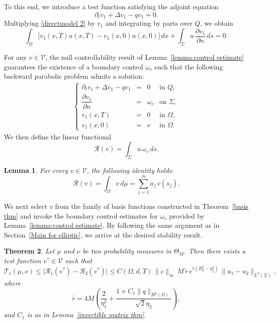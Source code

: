 \documentclass[12pt]{amsart}
\newtheorem{thm}{Theorem}
\newtheorem{lem}[thm]{Lemma}
\begin{document}
To this end, we introduce a test function satisfying the adjoint equation
\[
    \partial_t v_1+\Delta v_1 - q v_1=0.
\]
Multiplying \eqref{directmodel 2} by \(v_1\) and integrating by parts over \(Q\), we obtain
\begin{equation}
    \int_{\Omega} \bigl[v_1(x,T)u(x,T)-v_1(x,0)u(x,0)\bigr]\,dx
    +\int_{\Sigma}u\,\frac{\partial v_1}{\partial n}\,ds=0.
\end{equation}

For any \(v\in \mathcal{V}\), the null controllability result of Lemma~\ref{lemma:control estimate} 
guarantees the existence of a boundary control \(\omega_v\) such that the following backward 
parabolic problem admits a solution:
\begin{align*}
\left\{
\begin{array}{rcll}
\partial_t v_1 + \Delta v_1 - q v_1 &=& 0 & \text{in } Q, \\
\dfrac{\partial v_1}{\partial n} &=& \omega_v & \text{on } \Sigma, \\
v_1(x, T) &=& 0 & \text{in } \Omega, \\
v_1(x, 0) &=& v & \text{in } \Omega.
\end{array}
\right.
\end{align*}
We then define the linear functional
\begin{equation}
    \mathcal{R}(v)=\int_{\Sigma}u\,\omega_v\,ds.
\end{equation}

\begin{lem}
For every \(v\in \mathcal{V}\), the following identity holds:
\begin{equation}
    \mathcal{R}(v)=\int_{\Omega} v\,d\mu
    =\sum_{j=1}^m a_j\,v(s_j).
\end{equation}
\end{lem}

We next select \(v\) from the family of basis functions constructed in 
Theorem~\ref{basis thm} and invoke the boundary control estimates for \(\omega_v\) 
provided by Lemma~\ref{lemma:control estimate}. 
By following the same argument as in Section~\ref{Main for elliptic}, 
we arrive at the desired stability result.

\begin{thm}
Let \(\mu\) and \(\nu\) be two probability measures in \(\Theta_M\). 
Then there exists a test function \(v^*\in\mathcal{V}\) such that
\begin{equation}\label{main result1}
    \mathcal{T}_c(\mu, \nu) 
    \leq \bigl|\mathcal{R}_1(v^*)-\mathcal{R}_2(v^*)\bigr|
    \leq C(\Omega,d,T)\,\|c\|_{\infty}\,
        M\,\tilde{r}\, e^{\tilde{r}(R_0^2 - \eta_2^2)}\,
        \|u_1 - u_2\|_{L^2(\Sigma)},
\end{equation}
where
\[
\tilde{r} = 4M \left( \frac{2}{\eta_1^2} 
      + \frac{1 + C_1 \|q\|_{H^p(\Omega)}}{\sqrt{2} \eta_2} \right),
\]
and \(C_1\) is as in Lemma~\ref{invertible matrix thm}.
\end{thm}



 

\end{document}
